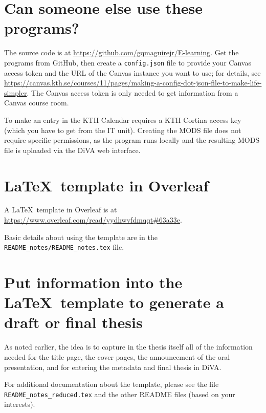 \documentclass[12pt, twoside]{article}
\newcommand{\fname}[1]{\texttt{#1}}
\begin{document}


\section{Can someone else use these programs?}
The source code is at \url{https://github.com/gqmaguirejr/E-learning}. Get the programs from GitHub, then create a \fname{config.json} file to provide your Canvas access token and the \gls{URL} of the Canvas instance you want to use; for details, see \url{https://canvas.kth.se/courses/11/pages/making-a-config-dot-json-file-to-make-life-simpler}. The Canvas access token is only needed to get information from a Canvas course room. 

To make an entry in the \gls{KTH} Calendar requires a \gls{KTH} Cortina access key (which you have to get from the IT unit). Creating the \gls{MODS} file does not require specific permissions, as the program runs locally and the resulting \gls{MODS} file is uploaded via the \gls{DiVA} web interface.

\section{\LaTeX{}~template in Overleaf}
A \LaTeX~template in Overleaf is at \url{https://www.overleaf.com/read/yydhwvfdmqqt#63a33e}.

Basic details about using the template are in  
the \fname{README\_notes/README\_notes.tex} file.

\section{Put information into the \LaTeX~template to generate a draft or final thesis}
\label{sec:putInformationIntoLatexTemplate}

As noted earlier, the idea is to capture in the thesis itself all of the information needed for the title page, the cover pages, the announcement of the oral presentation, and for entering the metadata and final thesis in \gls{DiVA}.

For additional documentation about the template, please see the file \fname{README\_notes\_reduced.tex} and the other README files (based on your interests).
\end{document}
